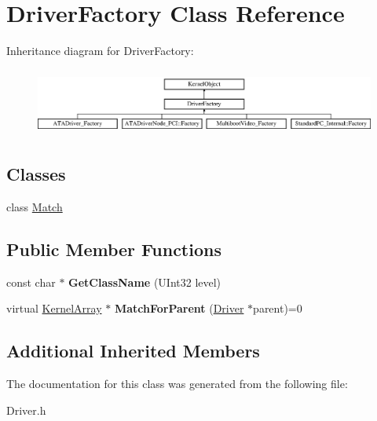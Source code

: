 \hypertarget{class_driver_factory}{}\section{Driver\+Factory Class Reference}
\label{class_driver_factory}
Inheritance diagram for Driver\+Factory\+:\begin{figure}[H]
\begin{center}
\leavevmode
\includegraphics[height=2.234043cm]{class_driver_factory}
\end{center}
\end{figure}
\subsection*{Classes}
\begin{DoxyCompactItemize}
\item 
class \hyperlink{class_driver_factory_1_1_match}{Match}
\end{DoxyCompactItemize}
\subsection*{Public Member Functions}
\begin{DoxyCompactItemize}
\item 
\mbox{\label{class_driver_factory_a5078ba6e7827958bb2ba233e4d3d2a2e}} 
const char $\ast$ {\bfseries Get\+Class\+Name} (U\+Int32 level)
\item 
\mbox{\label{class_driver_factory_ae714755a83d5e0a8ed20f156052e5b35}} 
virtual \hyperlink{class_kernel_array}{Kernel\+Array} $\ast$ {\bfseries Match\+For\+Parent} (\hyperlink{class_driver}{Driver} $\ast$parent)=0
\end{DoxyCompactItemize}
\subsection*{Additional Inherited Members}


The documentation for this class was generated from the following file\+:\begin{DoxyCompactItemize}
\item 
Driver.\+h\end{DoxyCompactItemize}
